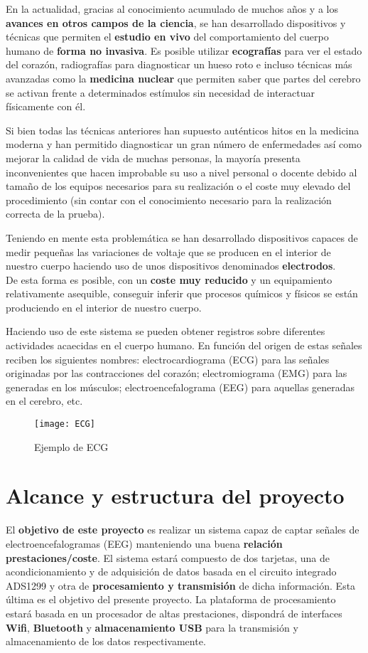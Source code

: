 En la actualidad, gracias al conocimiento acumulado de muchos años y a los \textbf{avances en otros campos de la ciencia}, se han desarrollado dispositivos y técnicas que permiten el \textbf{estudio en vivo} del comportamiento del cuerpo humano de \textbf{forma no invasiva}. Es posible utilizar \textbf{ecografías} para ver el estado del corazón, radiografías para diagnosticar un hueso roto e incluso técnicas más avanzadas como la \textbf{medicina nuclear} que permiten saber que partes del cerebro se activan frente a determinados estímulos sin necesidad de interactuar físicamente con él.

Si bien todas las técnicas anteriores han supuesto auténticos hitos en la medicina moderna y han permitido diagnosticar un gran número de enfermedades así como mejorar la calidad de vida de muchas personas, la mayoría presenta inconvenientes que hacen improbable su uso a nivel personal o docente debido al tamaño de los equipos necesarios para su realización o el coste muy elevado del procedimiento (sin contar con el conocimiento necesario para la realización correcta de la prueba).

Teniendo en mente esta problemática se han desarrollado dispositivos capaces de medir pequeñas las variaciones de voltaje que se producen en el interior de nuestro cuerpo haciendo uso de unos dispositivos denominados \textbf{electrodos}.
\\De esta forma es posible, con un \textbf{coste muy reducido} y un equipamiento relativamente asequible, conseguir inferir que procesos químicos y físicos se están produciendo en el interior de nuestro cuerpo.

Haciendo uso de este sistema se pueden obtener registros sobre diferentes actividades acaecidas en el cuerpo humano. En función del origen de estas señales reciben los siguientes nombres: electrocardiograma (ECG) para las señales originadas por las contracciones del corazón; electromiograma (EMG) para las generadas en los músculos; electroencefalograma (EEG) para aquellas generadas en el cerebro, etc.

\begin{figure} [H] %
    \centering
    \texttt{[image: ECG]}
    \caption{Ejemplo de ECG}
    \label{fig:ECG}
\end{figure}

\section{Alcance y estructura del proyecto}
El \textbf{objetivo de este proyecto} es realizar un sistema capaz de captar señales de electroencefalogramas (EEG) manteniendo una buena \textbf{relación prestaciones/coste}. El sistema estará compuesto de dos tarjetas, una de acondicionamiento y de adquisición de datos basada en el circuito integrado ADS1299 y otra de \textbf{procesamiento y transmisión} de dicha información. Esta última es el objetivo del presente proyecto. La plataforma de procesamiento estará basada en un procesador de altas prestaciones, dispondrá de interfaces \textbf{Wifi}, \textbf{Bluetooth} y \textbf{almacenamiento USB} para la transmisión y almacenamiento de los datos respectivamente. 

